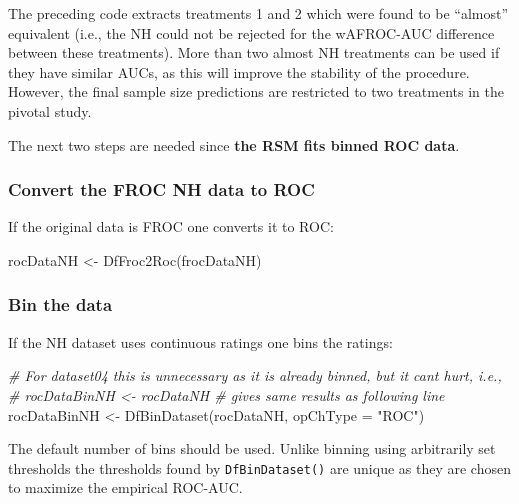 \documentclass[
]{book}
\newenvironment{Shaded}{\begin{snugshade}}{\end{snugshade}}
\newcommand{\AttributeTok}[1]{\textcolor[rgb]{0.77,0.63,0.00}{#1}}
\newcommand{\CommentTok}[1]{\textcolor[rgb]{0.56,0.35,0.01}{\textit{#1}}}
\newcommand{\FunctionTok}[1]{\textcolor[rgb]{0.00,0.00,0.00}{#1}}
\newcommand{\NormalTok}[1]{#1}
\newcommand{\OtherTok}[1]{\textcolor[rgb]{0.56,0.35,0.01}{#1}}
\newcommand{\StringTok}[1]{\textcolor[rgb]{0.31,0.60,0.02}{#1}}
\begin{document}
The preceding code extracts treatments 1 and 2 which were found \citep{zanca2009evaluation} to be ``almost'' equivalent (i.e., the NH could not be rejected for the wAFROC-AUC difference between these treatments). More than two almost NH treatments can be used if they have similar AUCs, as this will improve the stability of the procedure. However, the final sample size predictions are restricted to two treatments in the pivotal study.

The next two steps are needed since \textbf{the RSM fits binned ROC data}.

\hypertarget{convert-the-froc-nh-data-to-roc}{%
\subsubsection{Convert the FROC NH data to ROC}\label{convert-the-froc-nh-data-to-roc}}

If the original data is FROC one converts it to ROC:

\begin{Shaded}
\begin{Highlighting}[]
\NormalTok{rocDataNH }\OtherTok{\textless{}{-}} \FunctionTok{DfFroc2Roc}\NormalTok{(frocDataNH)}
\end{Highlighting}
\end{Shaded}

\hypertarget{bin-the-data}{%
\subsubsection{Bin the data}\label{bin-the-data}}

If the NH dataset uses continuous ratings one bins the ratings:

\begin{Shaded}
\begin{Highlighting}[]
\CommentTok{\# For dataset04 this is unnecessary as it is already binned, but it can\textquotesingle{}t hurt, i.e.,}
\CommentTok{\# rocDataBinNH \textless{}{-} rocDataNH \# gives same results as following line}
\NormalTok{rocDataBinNH }\OtherTok{\textless{}{-}} \FunctionTok{DfBinDataset}\NormalTok{(rocDataNH, }\AttributeTok{opChType =} \StringTok{"ROC"}\NormalTok{)}
\end{Highlighting}
\end{Shaded}

The default number of bins should be used. Unlike binning using arbitrarily set thresholds the thresholds found by \texttt{DfBinDataset()} are unique as they are chosen to maximize the empirical ROC-AUC.
\end{document}

